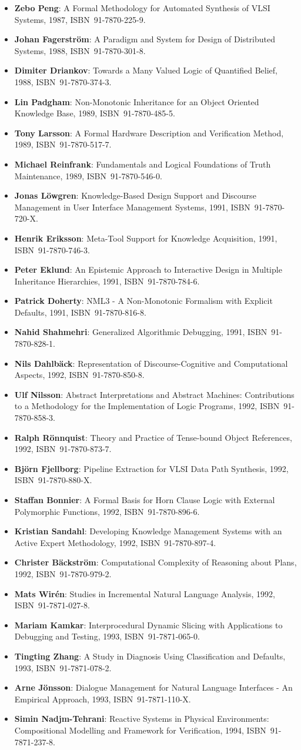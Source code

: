 \documentclass[a4paper,showtrims,twocolumn]{memoir}
\newenvironment{theses}{
  \begin{itemize}
    \setlength{\itemsep}{0.2em}
    \setlength{\parskip}{0em}
    \setlength{\parsep}{0em}
}{
  \end{itemize}
}
\newcommand{\thesis}[5]{\item[No. #1] \textbf{#2}: #3, #4, ISBN~#5.}
\begin{document}
\begin{theses}
    \thesis{170}{Zebo Peng}{A Formal Methodology for Automated Synthesis of VLSI Systems}{1987}{91-7870-225-9}
    \thesis{174}{Johan Fagerström}{A Paradigm and System for Design of Distributed Systems}{1988}{91-7870-301-8}
    \thesis{192}{Dimiter Driankov}{Towards a Many Valued Logic of Quantified Belief}{1988}{91-7870-374-3}
    \thesis{213}{Lin Padgham}{Non-Monotonic Inheritance for an Object Oriented Knowledge Base}{1989}{91-7870-485-5}
    \thesis{214}{Tony Larsson}{A Formal Hardware Description and Verification Method}{1989}{91-7870-517-7}
    \thesis{221}{Michael Reinfrank}{Fundamentals and Logical Foundations of Truth Maintenance}{1989}{91-7870-546-0}
    \thesis{239}{Jonas Löwgren}{Knowledge-Based Design Support and Discourse Management in User Interface Management Systems}{1991}{91-7870-720-X}
    \thesis{244}{Henrik Eriksson}{Meta-Tool Support for Knowledge Acquisition}{1991}{91-7870-746-3}
    \thesis{252}{Peter Eklund}{An Epistemic Approach to Interactive Design in Multiple Inheritance Hierarchies}{1991}{91-7870-784-6}
    \thesis{258}{Patrick Doherty}{NML3 - A Non-Monotonic Formalism with Explicit Defaults}{1991}{91-7870-816-8}
    \thesis{260}{Nahid Shahmehri}{Generalized Algorithmic Debugging}{1991}{91-7870-828-1}
    \thesis{264}{Nils Dahlbäck}{Representation of Discourse-Cognitive and Computational Aspects}{1992}{91-7870-850-8}
    \thesis{265}{Ulf Nilsson}{Abstract Interpretations and Abstract Machines: Contributions to a Methodology for the Implementation of Logic Programs}{1992}{91-7870-858-3}
    \thesis{270}{Ralph Rönnquist}{Theory and Practice of Tense-bound Object References}{1992}{91-7870-873-7}
    \thesis{273}{Björn Fjellborg}{Pipeline Extraction for VLSI Data Path Synthesis}{1992}{91-7870-880-X}
    \thesis{276}{Staffan Bonnier}{A Formal Basis for Horn Clause Logic with External Polymorphic Functions}{1992}{91-7870-896-6}
    \thesis{277}{Kristian Sandahl}{Developing Knowledge Management Systems with an Active Expert Methodology}{1992}{91-7870-897-4}
    \thesis{281}{Christer Bäckström}{Computational Complexity of Reasoning about Plans}{1992}{91-7870-979-2}
    \thesis{292}{Mats Wirén}{Studies in Incremental Natural Language Analysis}{1992}{91-7871-027-8}
    \thesis{297}{Mariam Kamkar}{Interprocedural Dynamic Slicing with Applications to Debugging and Testing}{1993}{91-7871-065-0}
    \thesis{302}{Tingting Zhang}{A Study in Diagnosis Using Classification and Defaults}{1993}{91-7871-078-2}
    \thesis{312}{Arne Jönsson}{Dialogue Management for Natural Language Interfaces - An Empirical Approach}{1993}{91-7871-110-X}
    \thesis{338}{Simin Nadjm-Tehrani}{Reactive Systems in Physical Environments: Compositional Modelling and Framework for Verification}{1994}{91-7871-237-8}

\end{theses}
\end{document}

